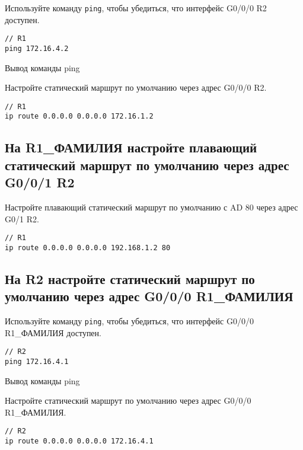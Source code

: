 Используйте команду \texttt{ping}, чтобы убедиться,
что интерфейс G0/0/0 R2 доступен.

\begin{verbatim}
// R1
ping 172.16.4.2
\end{verbatim}

\begin{image}
	\caption{Вывод команды ping}
\end{image}

Настройте статический маршрут по умолчанию через адрес G0/0/0 R2.

\begin{verbatim}
// R1
ip route 0.0.0.0 0.0.0.0 172.16.1.2
\end{verbatim}

\subsection{На R1\_ФАМИЛИЯ настройте плавающий статический маршрут
	по умолчанию через адрес G0/0/1 R2}

Настройте плавающий статический маршрут по умолчанию с AD 80 через адрес G0/1 R2.

\begin{verbatim}
// R1
ip route 0.0.0.0 0.0.0.0 192.168.1.2 80
\end{verbatim}

\subsection{На R2 настройте статический маршрут по умолчанию
	через адрес G0/0/0 R1\_ФАМИЛИЯ}

Используйте команду \texttt{ping}, чтобы убедиться,
что интерфейс G0/0/0 R1\_ФАМИЛИЯ доступен.

\begin{verbatim}
// R2
ping 172.16.4.1
\end{verbatim}

\begin{image}
	\caption{Вывод команды ping}
\end{image}

Настройте статический маршрут по умолчанию через адрес G0/0/0 R1\_ФАМИЛИЯ.

\begin{verbatim}
// R2
ip route 0.0.0.0 0.0.0.0 172.16.4.1
\end{verbatim}

